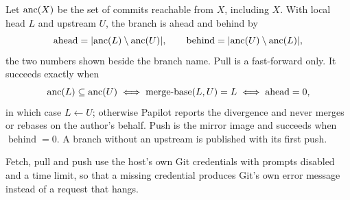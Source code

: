 Let $\operatorname{anc}(X)$ be the set of commits reachable from $X$, including $X$. With
local head $L$ and upstream $U$, the branch is ahead and behind by
\begin{equation}
  \operatorname{ahead} = \lvert\operatorname{anc}(L) \setminus \operatorname{anc}(U)\rvert, \qquad
  \operatorname{behind} = \lvert\operatorname{anc}(U) \setminus \operatorname{anc}(L)\rvert,
  \label{eq:ahead-behind}
\end{equation}
the two numbers shown beside the branch name. Pull is a fast-forward only. It
succeeds exactly when
\begin{equation}
  \operatorname{anc}(L) \subseteq \operatorname{anc}(U)
  \iff \operatorname{merge-base}(L, U) = L
  \iff \operatorname{ahead} = 0,
  \label{eq:fast-forward}
\end{equation}
in which case $L \leftarrow U$; otherwise Papilot reports the divergence and
never merges or rebases on the author's behalf. Push is the mirror image and
succeeds when $\operatorname{behind} = 0$. A branch without an upstream is
published with its first push.

\begin{remark}
Fetch, pull and push use the host's own Git credentials with prompts disabled
and a time limit, so that a missing credential produces Git's own error message
instead of a request that hangs.
\end{remark}
